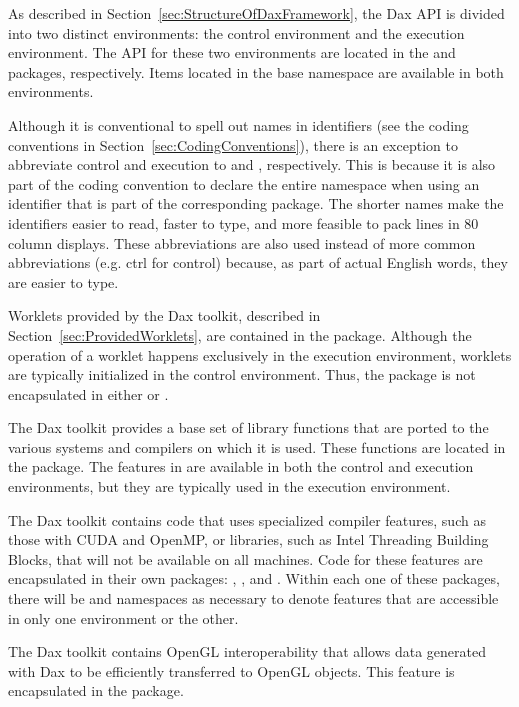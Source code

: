 As described in Section~\ref{sec:StructureOfDaxFramework}, the Dax API is
divided into two distinct environments:  the control
environment  and the execution
environment.  The API for these two
environments are located in the \daxcont{} and \daxexec{} packages,
respectively. Items located in the base \dax{} namespace are available in
both environments.

Although it is conventional to spell out names in identifiers (see the
coding conventions in Section~\ref{sec:CodingConventions}), there is an
exception to abbreviate control and execution to 
and , respectively. This is because it is also part of
the coding convention to declare the entire namespace when using an
identifier that is part of the corresponding package. The shorter names
make the identifiers easier to read, faster to type, and more feasible to
pack lines in 80 column displays. These abbreviations are also used instead
of more common abbreviations (e.g. ctrl for control) because, as part of
actual English words, they are easier to type.

Worklets provided by the Dax toolkit, described in
Section~\ref{sec:ProvidedWorklets}, are contained in the \daxworklet{}
package. Although the operation of a worklet happens exclusively in the
execution environment, worklets are typically initialized in the control
environment. Thus, the \daxworklet{} package is not encapsulated in either
\daxcont{} or \daxexec{}.

The Dax toolkit provides a base set of library functions that are ported to
the various systems and compilers on which it is used. These functions are
located in the \daxmath{} package. The features in \daxmath{} are available
in both the control and execution environments, but they are typically used
in the execution environment.

The Dax toolkit contains code that uses specialized compiler features, such
as those with CUDA and OpenMP, or libraries, such as Intel Threading
Building Blocks, that will not be available on all machines. Code for these
features are encapsulated in their own packages: \daxcuda{}, \daxopenmp{},
and \daxtbb{}. Within each one of these packages, there will
be  and  namespaces as necessary to
denote features that are accessible in only one environment or the other.

The Dax toolkit contains OpenGL interoperability 
 that allows data generated with Dax to be
efficiently transferred to OpenGL objects. This feature is encapsulated in
the \daxopengl{} package.

